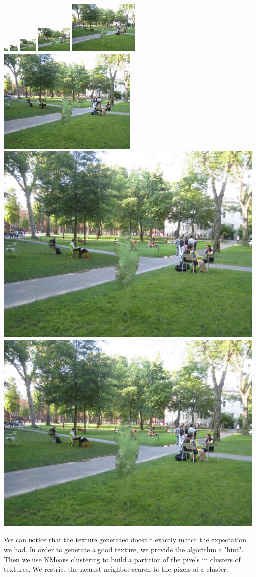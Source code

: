 \documentclass[a4paper]{article}
\begin{document}
  \medskip 
  \begin{center}
  \includegraphics[width=.003\textwidth]{results_texture/1/6x8_output.png}
  \includegraphics[width=.006\textwidth]{results_texture/1/12x16_output.png}
  \includegraphics[width=.0125\textwidth]{results_texture/1/24x32_output.png}
  \includegraphics[width=.025\textwidth]{results_texture/1/48x64_output.png}
  \includegraphics[width=.05\textwidth]{results_texture/1/96x128_output.png}
  \includegraphics[width=.1\textwidth]{results_texture/1/192x256_output.png}
  \includegraphics[width=.2\textwidth]{results_texture/1/384x512_output.png}
  \includegraphics[width=.4\textwidth]{results_texture/1/768x1024_output.png}
  \end{center}
  
  \medskip We can notice that the texture generated doesn't exactly match the expectation we had. In order to generate a good texture, we provide the algorithm a "hint". Then we use KMeans clustering to build a partition of the pixels in clusters of textures. We restrict the nearest neighbor search to the pixels of a cluster.
  
\end{document}
